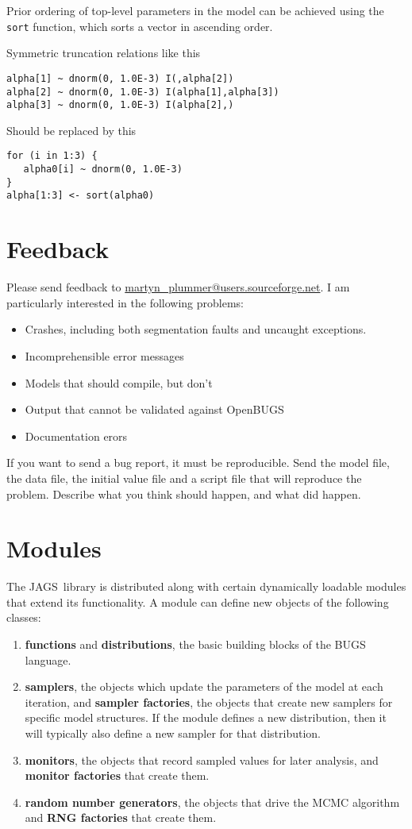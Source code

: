 \documentclass[11pt, a4paper, titlepage]{report}
\newcommand{\JAGS}{\textsf{JAGS}}
\newcommand{\OpenBUGS}{\textsf{OpenBUGS}}
\begin{document}
Prior ordering of top-level parameters in the model can be achieved
using the \texttt{sort} function, which sorts a vector in ascending
order.

Symmetric truncation relations like this
\begin{verbatim}
alpha[1] ~ dnorm(0, 1.0E-3) I(,alpha[2])
alpha[2] ~ dnorm(0, 1.0E-3) I(alpha[1],alpha[3])
alpha[3] ~ dnorm(0, 1.0E-3) I(alpha[2],)
\end{verbatim}
Should be replaced by this
\begin{verbatim}
for (i in 1:3) {
   alpha0[i] ~ dnorm(0, 1.0E-3)
}
alpha[1:3] <- sort(alpha0)
\end{verbatim}

\chapter{Feedback}

Please send feedback to \url{martyn_plummer@users.sourceforge.net}.
I am particularly interested in the following problems:

\begin{itemize}
\item Crashes, including both segmentation faults and uncaught exceptions.
\item Incomprehensible error messages
\item Models that should compile, but don't 
\item Output that cannot be validated against \OpenBUGS
\item Documentation erors
\end{itemize}

If you want to send a bug report, it must be reproducible. Send the
model file, the data file, the initial value file and a script file
that will reproduce the problem. Describe what you think should
happen, and what did happen.

\chapter{Modules}
\label{chapter:modules}

The \JAGS\  library is distributed along with certain dynamically
loadable modules that extend its functionality. A module can define
new objects of the following classes:
\begin{enumerate}
\item {\bf functions} and {\bf distributions}, the basic building
blocks of the BUGS language.
\item {\bf samplers}, the objects which update the parameters of the
model at each iteration, and {\bf sampler factories}, the objects that 
create new samplers for specific model structures.  If the module
defines a new distribution, then it will typically also define a new
sampler for that distribution.
\item {\bf monitors}, the objects that record sampled values for
later analysis, and {\bf monitor factories} that create them. 
\item {\bf random number generators}, the objects that drive the
MCMC algorithm and {\bf RNG factories} that create them.
\end{enumerate}
\end{document}
